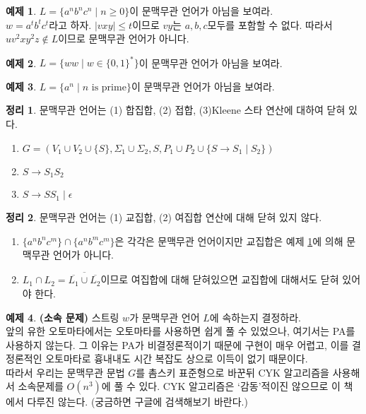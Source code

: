 \documentclass[b5paper]{book}
\theoremstyle{definition}
\newtheorem{thm}{정리}[chapter]
\newtheorem{ex}{예제}[chapter]
\newenvironment{pf*}{\pushQED{\qed}\pf}{\popQED\endpf}
\begin{document}
\begin{ex} \label{anbncn}
    $L = \{a^n b^n c^n \;\vert\; n \ge 0 \}$이 문맥무관 언어가 아님을 보여라. \\ 
    $w = a^tb^tc^t$라고 하자. $\vert vxy \vert \le t$이므로 $vy$는 $a,b,c$모두를 포함할 수 없다.
    따라서 $uv^2 x y^2 z \notin L$이므로 문맥무관 언어가 아니다. 
\end{ex}
\begin{ex}
    $L = \{ww \;\vert\; w \in \{0,1\}^*\}$이 문맥무관 언어가 아님을 보여라. 
\end{ex}
\begin{ex}
    $L = \{a^n \;\vert\; n \text{ is prime}\}$이 문맥무관 언어가 아님을 보여라.
\end{ex}
\begin{thm}
    문맥무관 언어는 (1) 합집합, (2) 접합, (3)Kleene 스타 연산에 대하여 닫혀 있다.
\end{thm}
\begin{pf*}
    \begin{enumerate}
        \item $G = (V_1 \cup V_2 \cup \{S\}, \Sigma_1 \cup \Sigma_2, S,
         P_1 \cup P_2 \cup \{S \rightarrow S_1 \;\vert\; S_2\})$
        \item $S \rightarrow S_1S_2$
        \item $S \rightarrow SS_1 \;\vert\; \epsilon$
    \end{enumerate}
\end{pf*}
\begin{thm}
    문맥무관 언어는 (1) 교집합, (2) 여집합 연산에 대해 닫혀 있지 않다. 
\end{thm}
\begin{pf*}
    \begin{enumerate}
        \item $\{a^nb^nc^m\} \cap \{a^nb^mc^m\}$은 각각은 문맥무관 언어이지만 
        교집합은 예제 \ref{anbncn}에 의해 문맥무관 언어가 아니다.
        \item $L_1 \cap L_2 = \overline{\overline{L_1} \cup \overline{L_2}}$이므로 
        여집합에 대해 닫혀있으면
        교집합에 대해서도 닫혀 있어야 한다. 
    \end{enumerate}
\end{pf*}
\begin{ex}
    \textbf{(소속 문제)} 스트링 $w$가 문맥무관 언어 $L$에 속하는지 결정하라. \\ 
    앞의 유한 오토마타에서는 오토마타를 사용하면 쉽게 풀 수 있었으나, 여기서는 PA를 사용하지 않는다. 
    그 이유는 PA가 비결정론적이기 때문에 구현이 매우 어렵고, 이를 결정론적인 오토마타로 흉내내도 
    시간 복잡도 상으로 이득이 없기 때문이다. \\ 
    따라서 우리는 문맥무관 문법 $G$를 촘스키 표준형으로 바꾼뒤 
    CYK 알고리즘을 사용해서 소속문제를 $O(n^3)$에 풀 수 있다. 
    CYK 알고리즘은  `감동'적이진 않으므로 이 책에서 다루진 않는다. 
    (궁금하면 구글에 검색해보기 바란다.)
\end{ex}
\end{document}
